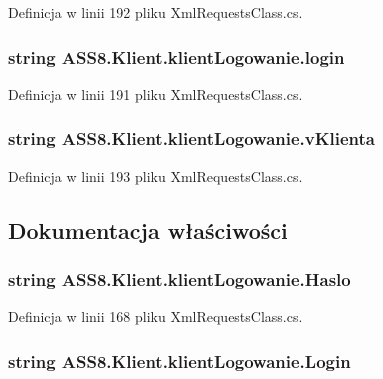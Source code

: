 Definicja w linii 192 pliku XmlRequestsClass.cs.\hypertarget{a00009_1fa00149f1a375887302be1b66d76f51}{
\subsubsection[{login}]{\setlength{\rightskip}{0pt plus 5cm}string {\bf ASS8.Klient.klientLogowanie.login}}}
\label{da/da0/a00009_1fa00149f1a375887302be1b66d76f51}




Definicja w linii 191 pliku XmlRequestsClass.cs.\hypertarget{a00009_4f1ccf1f388e4f7c412a91ceefd11cc8}{
\subsubsection[{vKlienta}]{\setlength{\rightskip}{0pt plus 5cm}string {\bf ASS8.Klient.klientLogowanie.vKlienta}}}
\label{da/da0/a00009_4f1ccf1f388e4f7c412a91ceefd11cc8}




Definicja w linii 193 pliku XmlRequestsClass.cs.

\subsection{Dokumentacja właściwości}
\hypertarget{a00009_6f3c62f8e9b616f4b214788974fe93cd}{
\subsubsection[{Haslo}]{\setlength{\rightskip}{0pt plus 5cm}string ASS8.Klient.klientLogowanie.Haslo}}
\label{da/da0/a00009_6f3c62f8e9b616f4b214788974fe93cd}




Definicja w linii 168 pliku XmlRequestsClass.cs.\hypertarget{a00009_bf20831d9b7c79f4c9de90320ff7e250}{
\subsubsection[{Login}]{\setlength{\rightskip}{0pt plus 5cm}string ASS8.Klient.klientLogowanie.Login}}
\label{da/da0/a00009_bf20831d9b7c79f4c9de90320ff7e250}




